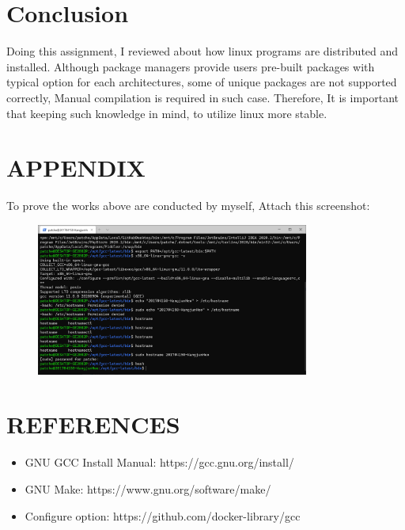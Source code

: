 \documentclass{article}
\begin{document}
\section{Conclusion}

Doing this assignment, I reviewed about how linux programs are distributed and installed.
Although package managers provide users pre-built packages with typical option for each architectures,
some of unique packages are not supported correctly, Manual compilation is required in such case. 
Therefore, It is important that keeping such knowledge in mind, to utilize linux more stable.

\section*{APPENDIX}

To prove the works above are conducted by myself, Attach this screenshot:

\begin{figure}[!htbp]
    \centering
    \includegraphics[width=0.8\textwidth]{images/11.png}
\end{figure}


\section*{REFERENCES}

\begin{itemize}
    \item GNU GCC Install Manual: https://gcc.gnu.org/install/
    \item GNU Make: https://www.gnu.org/software/make/
    \item Configure option: https://github.com/docker-library/gcc
\end{itemize}
\end{document}
